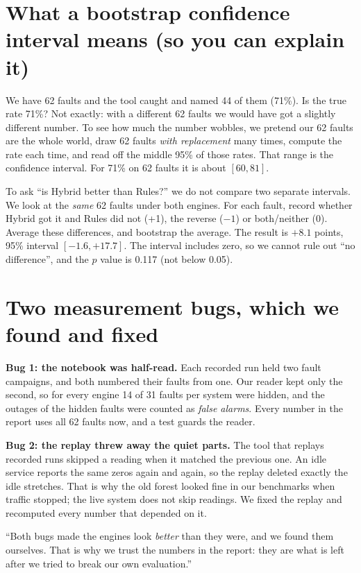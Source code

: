 \section{What a bootstrap confidence interval means (so you can explain it)}
\begin{simplebox}
We have 62 faults and the tool caught and named 44 of them (71\%). Is the true rate 71\%? Not exactly: with a different 62 faults we would have got a slightly different number. To see how much the number wobbles, we pretend our 62 faults are the whole world, draw 62 faults \emph{with replacement} many times, compute the rate each time, and read off the middle 95\% of those rates. That range is the confidence interval. For 71\% on 62 faults it is about $[60, 81]$.
\end{simplebox}

\begin{examplebox}
To ask ``is Hybrid better than Rules?'' we do not compare two separate intervals. We look at the \emph{same} 62 faults under both engines. For each fault, record whether Hybrid got it and Rules did not (+1), the reverse ($-1$) or both/neither (0). Average these differences, and bootstrap the average. The result is $+8.1$ points, 95\% interval $[-1.6,+17.7]$. The interval includes zero, so we cannot rule out ``no difference'', and the $p$ value is 0.117 (not below 0.05).
\end{examplebox}

\section{Two measurement bugs, which we found and fixed}
\begin{simplebox}
\textbf{Bug 1: the notebook was half-read.} Each recorded run held two fault campaigns, and both numbered their faults from one. Our reader kept only the second, so for every engine 14 of 31 faults per system were hidden, and the outages of the hidden faults were counted as \emph{false alarms}. Every number in the report uses all 62 faults now, and a test guards the reader.

\textbf{Bug 2: the replay threw away the quiet parts.} The tool that replays recorded runs skipped a reading when it matched the previous one. An idle service reports the same zeros again and again, so the replay deleted exactly the idle stretches. That is why the old forest looked fine in our benchmarks when traffic stopped; the live system does not skip readings. We fixed the replay and recomputed every number that depended on it.
\end{simplebox}

\begin{saybox}
``Both bugs made the engines look \emph{better} than they were, and we found them ourselves. That is why we trust the numbers in the report: they are what is left after we tried to break our own evaluation.''
\end{saybox}
